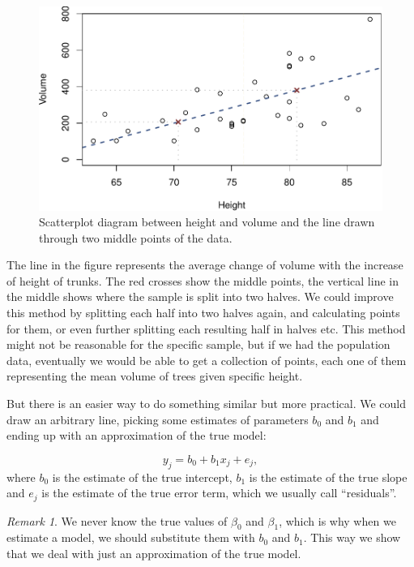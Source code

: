\documentclass[
]{book}
\theoremstyle{definition}
\theoremstyle{definition}
\theoremstyle{definition}
\theoremstyle{definition}
\theoremstyle{remark}
\newtheorem*{remark}{Remark}
\begin{document}
\begin{figure}
\centering
\includegraphics{Svetunkov---Statistics-for-Business-Analytics_files/figure-latex/TreesModelSegments-1.pdf}
\caption{\label{fig:TreesModelSegments}Scatterplot diagram between height and volume and the line drawn through two middle points of the data.}
\end{figure}

The line in the figure represents the average change of volume with the increase of height of trunks. The red crosses show the middle points, the vertical line in the middle shows where the sample is split into two halves. We could improve this method by splitting each half into two halves again, and calculating points for them, or even further splitting each resulting half in halves etc. This method might not be reasonable for the specific sample, but if we had the population data, eventually we would be able to get a collection of points, each one of them representing the mean volume of trees given specific height.

But there is an easier way to do something similar but more practical. We could draw an arbitrary line, picking some estimates of parameters \(b_0\) and \(b_1\) and ending up with an approximation of the true model:

\begin{equation}
    {y}_j = b_0 + b_1 x_j + e_j,
    \label{eq:SLRFormulaEstimated}
\end{equation}
where \(b_0\) is the estimate of the true intercept, \(b_1\) is the estimate of the true slope and \(e_j\) is the estimate of the true error term, which we usually call ``residuals''.

\begin{remark}
We never know the true values of \(\beta_0\) and \(\beta_1\), which is why when we estimate a model, we should substitute them with \(b_0\) and \(b_1\). This way we show that we deal with just an approximation of the true model.
\end{remark}
\end{document}

